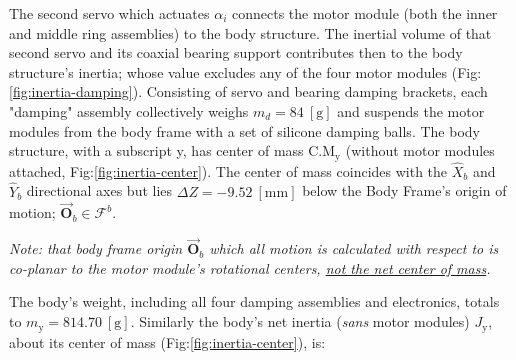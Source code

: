 The second servo which actuates $\alpha_i$ connects the motor module (both the inner and middle ring assemblies) to the body structure. The inertial volume of that second servo and its coaxial bearing support contributes then to the body structure's inertia; whose value excludes any of the four motor modules (Fig:\ref{fig:inertia-damping}). Consisting of servo and bearing damping brackets, each "damping" assembly collectively weighs $m_{d}=84~[\text{g}]$ and suspends the motor modules from the body frame with a set of silicone damping balls. The body structure, with a subscript y, has center of mass $\text{C.M}_{\text{y}}$ (without motor modules attached, Fig:\ref{fig:inertia-center}). The center of mass coincides with the $\hat{X}_b$ and $\hat{Y}_b$ directional axes but lies $\Delta Z=-9.52~[\text{mm}]$ below the Body Frame's origin of motion; $\vec{\mathbf{O}}_b\in\mathcal{F}^b$.
\par
\emph{\color{Gray}Note: that body frame origin $\vec{\mathbf{O}}_b$ which all motion is calculated with respect to is co-planar to the motor module's rotational centers, \underline{not the net center of mass}.}
\par
The body's weight, including all four damping assemblies and electronics, totals to $m_\text{y}=814.70~[\text{g}]$. Similarly the body's net inertia (\emph{sans} motor modules) $J_\text{y}$, about its center of mass (Fig:\ref{fig:inertia-center}), is:
